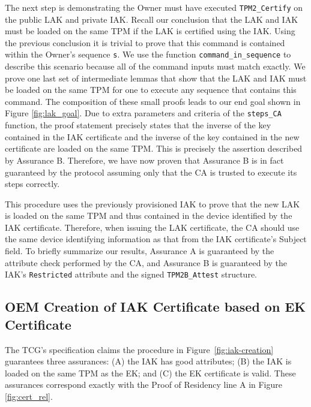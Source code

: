 \documentclass[runningheads]{llncs}
\begin{document}
The next step is demonstrating the Owner must have executed
\verb|TPM2_Certify| on the public LAK and private IAK.  Recall our
conclusion that the LAK and IAK must be loaded on the same TPM if the
LAK is certified using the IAK. Using the previous conclusion it is
trivial to prove that this command is contained within the Owner's
sequence \verb|s|.  We use the function \verb|command_in_sequence| to
describe this scenario because all of the command inputs must match
exactly.  We prove one last set of intermediate lemmas that show that
the LAK and IAK must be loaded on the same TPM for one to execute any
sequence that contains this command.  The composition of these small
proofs leads to our end goal shown in Figure \ref{fig:lak_goal}. Due
to extra parameters and criteria of the \verb|steps_CA| function, the
proof statement precisely states that the inverse of the key contained
in the IAK certificate and the inverse of the key contained in the new
certificate are loaded on the same TPM.  This is precisely the
assertion described by Assurance B.  Therefore, we have now proven
that Assurance B is in fact guaranteed by the protocol assuming only
that the CA is trusted to execute its steps correctly.

This procedure uses the previously provisioned IAK to prove that the
new LAK is loaded on the same TPM and thus contained in the device
identified by the IAK certificate. Therefore, when issuing the LAK
certificate, the CA should use the same device identifying information
as that from the IAK certificate's Subject field. To briefly summarize
our results, Assurance A is guaranteed by the attribute check
performed by the CA, and Assurance B is guaranteed by the IAK's
\verb|Restricted| attribute and the signed \verb|TPM2B_Attest|
structure.

\subsection{OEM Creation of IAK Certificate based on EK Certificate}

The TCG's specification claims the procedure in
Figure~\ref{fig:iak-creation} guarantees three assurances: (A) the IAK
has good attributes; (B) the IAK is loaded on the same TPM as the EK;
and (C) the EK certificate is valid. These assurances correspond
exactly with the Proof of Residency line A in Figure
\ref{fig:cert_rel}.
\end{document}
